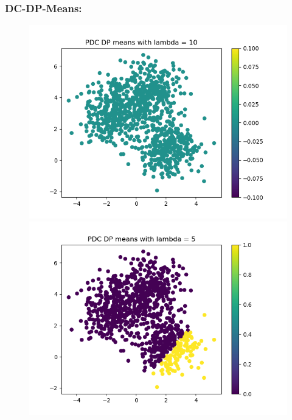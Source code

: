 \documentclass[12pt]{article}
\begin{document}
\subsubsection*{DC-DP-Means:}
\begin{figure}[!h]
    \begin{minipage}{0.5\textwidth}
    \centering
    \includegraphics[scale=0.4]{images/task2_dlv__l10}
    \end{minipage}
    \begin{minipage}{0.5\textwidth}
    \centering
    \includegraphics[scale=0.4]{images/task2_dlv__l5}
    \end{minipage}
    \begin{minipage}{0.5\textwidth}
    \centering

\end{minipage}
\end{figure}
\end{document}
